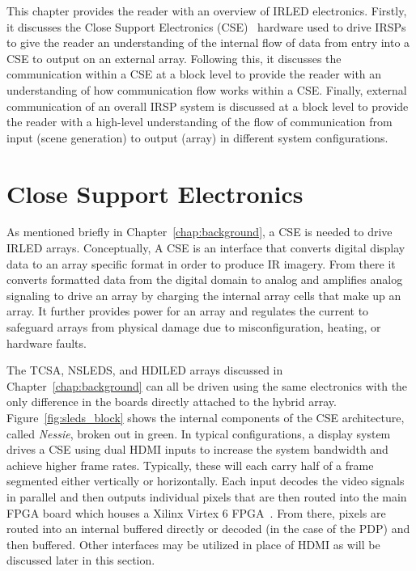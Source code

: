 \label{chap:system_overview}
This chapter provides the reader with an overview of IRLED electronics. Firstly, it discusses the Close Support Electronics (CSE)~\cite{EjzakEtAl2015,HernandezEtAl2019,SinghEtAl2020} hardware used to drive IRSPs to give the reader an understanding of the internal flow of data from entry into a CSE to output on an external array. Following this, it discusses the communication within a CSE at a block level to provide the reader with an understanding of how communication flow works within a CSE. Finally, external communication of an overall IRSP system is discussed at a block level to provide the reader with a high-level understanding of the flow of communication from input (scene generation) to output (array) in different system configurations.

\section{Close Support Electronics}
    \label{sec:close_support_electronics}
    As mentioned briefly in Chapter~\ref{chap:background}, a CSE is needed to drive IRLED arrays. Conceptually, A CSE is an interface that converts digital display data to an array specific format in order to produce IR imagery. From there it converts formatted data from the digital domain to analog and amplifies analog signaling to drive an array by charging the internal array cells that make up an array. It further provides power for an array and regulates the current to safeguard arrays from physical damage due to misconfiguration, heating, or hardware faults.

    The TCSA, NSLEDS, and HDILED arrays discussed in Chapter~\ref{chap:background} can all be driven using the same electronics with the only difference in the boards directly attached to the hybrid array. Figure~\ref{fig:sleds_block} shows the internal components of the CSE architecture, called {\it Nessie}, broken out in green. In typical configurations, a display system drives a CSE using dual HDMI inputs to increase the system bandwidth and achieve higher frame rates. Typically, these will each carry half of a frame segmented either vertically or horizontally. Each input decodes the video signals in parallel and then outputs individual pixels that are then routed into the main FPGA board which houses a Xilinx Virtex 6 FPGA~\cite{XILINX2015}. From there, pixels are routed into an internal buffered directly or decoded (in the case of the PDP) and then buffered. Other interfaces may be utilized in place of HDMI as will be discussed later in this section.

